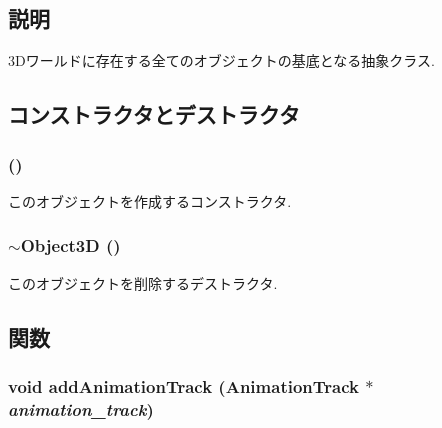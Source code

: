 \subsection{説明}
3Dワールドに存在する全てのオブジェクトの基底となる抽象クラス. 

\subsection{コンストラクタとデストラクタ}
\hypertarget{classm3g_1_1Object3D_f4b10c33b9014a3f0a675ef4b699b773}{
\subsubsection[{Object3D}]{ ()}}
\label{classm3g_1_1Object3D_f4b10c33b9014a3f0a675ef4b699b773}


このオブジェクトを作成するコンストラクタ. \hypertarget{classm3g_1_1Object3D_8ece10725587e63a2c75283c16cc4df5}{
\subsubsection[{$\sim$Object3D}]{\setlength{\rightskip}{0pt plus 5cm}$\sim${\bf Object3D} ()}}
\label{classm3g_1_1Object3D_8ece10725587e63a2c75283c16cc4df5}


このオブジェクトを削除するデストラクタ. 

\subsection{関数}
\hypertarget{classm3g_1_1Object3D_415c0b110f95410ded9b85e5d99a496b}{
\subsubsection[{addAnimationTrack}]{\setlength{\rightskip}{0pt plus 5cm}void addAnimationTrack ({\bf AnimationTrack} $\ast$ {\em animation\_\-track})}}
\label{classm3g_1_1Object3D_415c0b110f95410ded9b85e5d99a496b}


